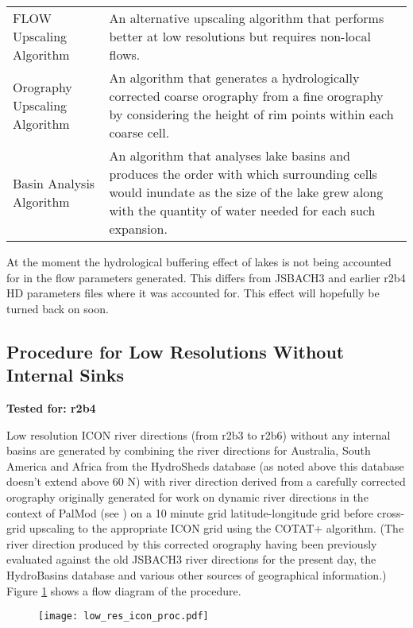\documentclass{article}
\begin{document}
{\begin{center}
\begin{longtable} { | l | p{8cm} |}
FLOW Upscaling Algorithm & An alternative upscaling algorithm that performs better at low resolutions but requires non-local flows.\\
Orography Upscaling Algorithm &An algorithm that generates a hydrologically corrected coarse orography from a fine orography by considering the height of rim points within each coarse cell. \\
Basin Analysis Algorithm & An algorithm that analyses lake basins and produces the order with which surrounding cells would inundate as the size of the lake grew along with the quantity of water needed for each such expansion. \\
\hline
\end{longtable}
\label{table-tools-descs}
\end{center}}

At the moment the hydrological buffering effect of lakes is not being accounted for in the flow parameters generated. This differs from JSBACH3 and earlier r2b4 HD parameters files where it was accounted for. This effect will hopefully be turned back on soon.

\subsection{Procedure for Low Resolutions Without Internal Sinks}
\noindent\textbf{Tested for: r2b4}

Low resolution ICON river directions (from r2b3 to r2b6) without any internal basins are generated by combining the river directions for Australia, South America and Africa from the HydroSheds database (as noted above this database doesn't extend above 60 \degree N) with river direction derived from a carefully corrected orography originally generated for work on dynamic river directions in the context of PalMod (see \cite{gmd-11-4291-2018}) on a 10 minute grid latitude-longitude grid before cross-grid upscaling to the appropriate ICON grid using the COTAT+ algorithm. (The river direction produced by this corrected orography having been previously evaluated against the old JSBACH3 river directions for the present day, the HydroBasins database and various other sources of geographical information.) Figure \ref{fig-low-res-icon-proc} shows a flow diagram of the procedure. \newline

\begin{figure}
\texttt{[image: low\_res\_icon\_proc.pdf]}
\caption{}
\label{fig-low-res-icon-proc}
\end{figure}
\end{document}

